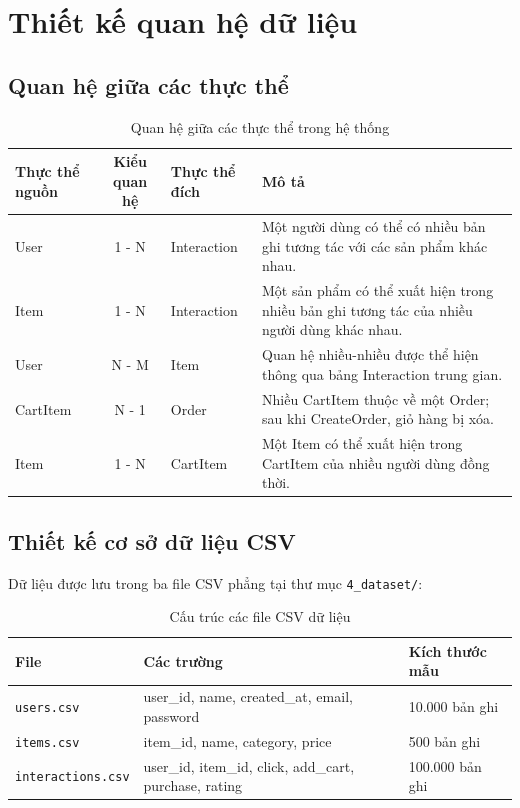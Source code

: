 \documentclass{report}
\begin{document}
\section{Thiết kế quan hệ dữ liệu}

\subsection{Quan hệ giữa các thực thể}

\begin{table}[H]
    \centering
    \renewcommand{\arraystretch}{1.4}
    \begin{tabularx}{\textwidth}{|l|c|l|>{\raggedright\arraybackslash}X|}
        \hline
        \textbf{Thực thể nguồn} & \textbf{Kiểu quan hệ} & \textbf{Thực thể đích} & \textbf{Mô tả} \\ \hline
        User & 1 - N & Interaction & Một người dùng có thể có nhiều bản ghi tương tác với các sản phẩm khác nhau. \\ \hline
        Item & 1 - N & Interaction & Một sản phẩm có thể xuất hiện trong nhiều bản ghi tương tác của nhiều người dùng khác nhau. \\ \hline
        User & N - M & Item & Quan hệ nhiều-nhiều được thể hiện thông qua bảng Interaction trung gian. \\ \hline
        CartItem & N - 1 & Order & Nhiều CartItem thuộc về một Order; sau khi CreateOrder, giỏ hàng bị xóa. \\ \hline
        Item & 1 - N & CartItem & Một Item có thể xuất hiện trong CartItem của nhiều người dùng đồng thời. \\ \hline
    \end{tabularx}
    \caption{Quan hệ giữa các thực thể trong hệ thống}
    \label{tab:entity_relations}
\end{table}

\subsection{Thiết kế cơ sở dữ liệu CSV}

Dữ liệu được lưu trong ba file CSV phẳng tại thư mục \texttt{4\_dataset/}:

\begin{table}[H]
    \centering
    \renewcommand{\arraystretch}{1.4}
    \begin{tabularx}{\textwidth}{|l|>{\raggedright\arraybackslash}X|l|}
        \hline
        \textbf{File} & \textbf{Các trường} & \textbf{Kích thước mẫu} \\ \hline
        \texttt{users.csv} & user\_id, name, created\_at, email, password & 10.000 bản ghi \\ \hline
        \texttt{items.csv} & item\_id, name, category, price & 500 bản ghi \\ \hline
        \texttt{interactions.csv} & user\_id, item\_id, click, add\_cart, purchase, rating & 100.000 bản ghi \\ \hline
    \end{tabularx}
    \caption{Cấu trúc các file CSV dữ liệu}
    \label{tab:csv_structure}
\end{table}
\end{document}

